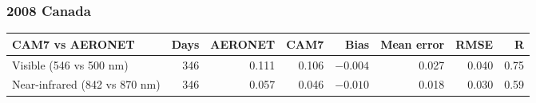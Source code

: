 \begin{frame}[t]
\frametitle{2008 Canada}
\centering
{}\hfill
{}\par
\vspace{0.15cm}
\hfill
{}\par
\vspace{0.1cm}
{\tiny\setlength{\tabcolsep}{5pt}
\begin{tabular}{@{}lrrrrrrr@{}}
\toprule
CAM7 vs AERONET & Days & AERONET & CAM7 & Bias & Mean error & RMSE & R \\
\midrule
Visible (546 vs 500 nm) & 346 & 0.111 & 0.106 & $-0.004$ & 0.027 & 0.040 & 0.75 \\
Near-infrared (842 vs 870 nm) & 346 & 0.057 & 0.046 & $-0.010$ & 0.018 & 0.030 & 0.59 \\
\bottomrule
\end{tabular}\par}
\end{frame}
